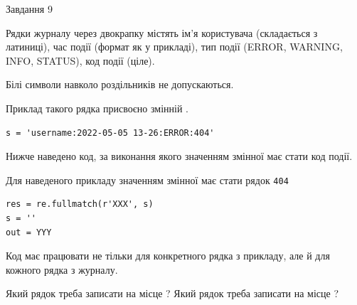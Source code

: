 \documentclass[12pt, ukrainian]{article}
\def\code#1{\Verb!#1!}
\begin{document}
{\begin{minipage}[t]{8.0cm}
\end{minipage}

               
{\begin{center}Завдання {9}\end{center}}
\vspace{-6mm}
Рядки журналу через двокрапку містять ім'я користувача (складається з латиниці), час події (фор\-мат як у прикладі), тип події (ERROR, WARNING, INFO, STATUS), код події (ціле).

Білі символи навколо роздільників не допускаються.

Приклад такого рядка присвоєно змінній .



\begin{verbatim}
s = 'username:2022-05-05 13-26:ERROR:404'
\end{verbatim}


Нижче наведено код, за виконання якого значенням змінної  має стати код події.

Для наведеного прикладу значенням змінної  має стати рядок \code{404}



\begin{verbatim}
res = re.fullmatch(r'XXX', s)
s = ''
out = YYY
\end{verbatim}


Код має працювати не тільки для конкретного рядка з прикладу, але й для кожного рядка з журналу.


Який рядок треба записати на місце  ?
Який рядок треба записати на місце  ?\par

}
\newpage
\end{document}
